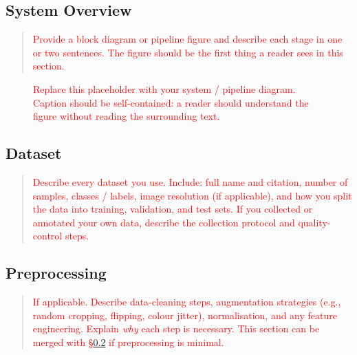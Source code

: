 \documentclass[journal, 10pt, twoside]{IEEEtran}
\begin{document}
\subsection{System Overview}
\label{ssec:overview}

\begin{quote}
  \textcolor{red}{%
    Provide a block diagram or pipeline figure and describe each stage in one or two sentences.  The figure should be the first thing a reader sees in this section.%
  }
\end{quote}

\begin{figure}[t]
  \centering
  \fbox{\rule{0pt}{3cm}\rule{\columnwidth}{0pt}} %
  \caption{\textcolor{red}{Replace this placeholder with your system / pipeline diagram.  Caption should be self-contained: a reader should understand the figure without reading the surrounding text.}}
  \label{fig:pipeline}
\end{figure}

\subsection{Dataset}
\label{ssec:dataset}

\begin{quote}
  \textcolor{red}{%
    Describe every dataset you use.  Include: full name and citation, number of samples, classes / labels, image resolution (if applicable), and how you split the data into training, validation, and test sets. If you collected or annotated your own data, describe the collection protocol and quality-control steps.%
  }
\end{quote}

\subsection{Preprocessing}
\label{ssec:preprocessing}

\begin{quote}
  \textcolor{red}{%
    If applicable. Describe data-cleaning steps, augmentation strategies (e.g., random cropping, flipping, colour jitter), normalisation, and any feature engineering.  Explain \emph{why} each step is necessary. This section can be merged with \S\ref{ssec:dataset} if preprocessing is minimal.%
  }
\end{quote}
\end{document}
